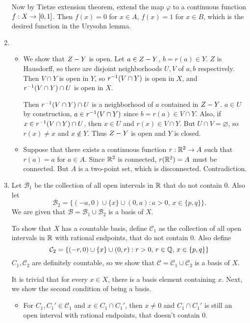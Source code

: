 \documentclass[12pt]{report}
\newcommand{\prob}[1]{\item[\large\textbf{\sffamily #1.}]}
\newcommand{\subprob}[1]{\item[\textbf{\sffamily (#1)}]}
\newcommand{\B}{\mathcal{B}}
\renewcommand{\C}{\mathcal{C}}
\begin{document}
\begin{enumerate}
    Now by Tietze extension theorem, extend the map \(\varphi\) to a continuous function \(f : X \rightarrow [0, 1]\). Then \(f(x) = 0\) for \(x \in A\), \(f(x) = 1\) for \(x \in B\), which is the desired function in the Urysohn lemma.

    \prob{7}
    \begin{itemize}
        \subprob{a} We show that \(Z - Y\) is open. Let \(a \in Z - Y\), \(b = r(a) \in Y\). \(Z\) is Hausdorff, so there are disjoint neighborhoods \(U, V\) of \(a, b\) respectively. Then \(V \cap Y\) is open in \(Y\), so \(r^{-1}(V\cap Y)\) is open in \(X\), and \(r^{-1}(V\cap Y) \cap U\) is open in \(X\).

        Then \(r^{-1}(V\cap Y) \cap U\) is a neighborhood of \(a\) contained in \(Z - Y\). \(a \in U\) by construction, \(a \in r^{-1}(V\cap Y)\) since \(b = r(a) \in V \cap Y\). Also, if \(x \in r^{-1}(V\cap Y) \cap U\), then \(x \in U\) and \(r(x) \in V \cap Y\). But \(U \cap V = \varnothing\), so \(r(x) \neq x\) and \(x \notin Y\). Thus \(Z - Y\) is open and \(Y\) is closed.

        \subprob{b} Suppose that there exists a continuous function \(r : \mathbb{R}^2 \rightarrow A\) such that \(r(a) = a\) for \(a \in A\). Since \(\mathbb{R}^2\) is connected, \(r(\mathbb{R}^2) = A\) must be connected. But \(A\) is a two-point set, which is disconnected. Contradiction.
    \end{itemize}

    \prob{8} Let \(\B_1\) be the collection of all open intervals in \(\mathbb{R}\) that do not contain \(0\). Also let
    \[
        \B_2 = \{(-a, 0) \cup \{x\} \cup (0, a) : a > 0,\, x \in \{p
    , q\}\}.
    \]
    We are given that \(\B = \B_1 \cup \B_2\) is a basis of \(X\).

    To show that \(X\) has a countable basis, define \(\C_1\) as the collection of all open intervals in \(\mathbb{R}\) with rational endpoints, that do not contain \(0\). Also define
    \[
        \C_2 = \{(-r, 0) \cup \{x\} \cup (0, r) : r > 0,\, r \in \Q,\, x \in \{p, q\}\}
    \]
    \(C_1, \C_2\) are definitely countable, so we show that \(\C = \C_1 \cup \C_2\) is a basis of \(X\).

    It is trivial that for every \(x \in X\), there is a basis element containing \(x\). Next, we show the second condition of being a basis.
    \begin{itemize}
        \item For \(C_1, C_1' \in \C_1\) and \(x \in C_1 \cap C_1'\), then \(x \neq 0\) and \(C_1 \cap C_1'\) is still an open interval with rational endpoints, that doesn't contain \(0\).


\end{itemize}
\end{enumerate}
\end{document}
